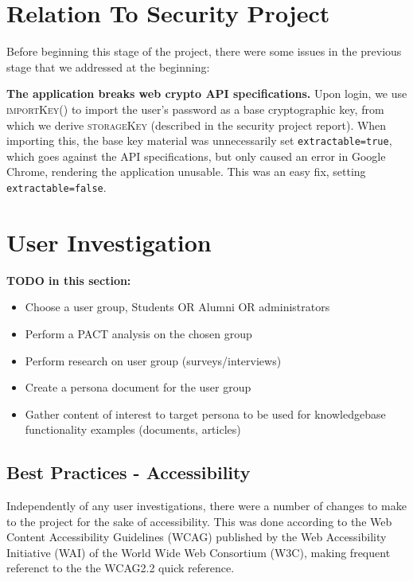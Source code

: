 \documentclass[12pt]{article}
\newcommand{\bryce}{\hfill\normalsize\sc [bkni0201]}
\newcommand{\skey}{\textsc{storageKey} }
\newcommand{\func}[1]{\textsc{#1()}}
\begin{document}
\tableofcontents
\newpage

\section{Relation To Security Project}

Before beginning this stage of the project, there were some issues in the previous stage that we addressed at the beginning:

\textbf{The application breaks web crypto API specifications.} Upon login, we use \func{importKey} to import the user's password as a base cryptographic key, from which we derive \skey (described in the security project report). When importing this, the base key material was unnecessarily set \texttt{extractable=true}, which goes against the API specifications, but only caused an error in Google Chrome, rendering the application unusable. This was an easy fix, setting \texttt{extractable=false}.


\section{User Investigation}

\textbf{TODO in this section:}
\begin{itemize}
    \item Choose a user group, Students OR Alumni OR administrators
    \item Perform a PACT analysis on the chosen group
    \item Perform research on user group (surveys/interviews)
    \item Create a persona document for the user group
    \item Gather content of interest to target persona to be used for knowledgebase functionality examples (documents, articles)
\end{itemize}

\subsection{Best Practices - Accessibility \bryce}

Independently of any user investigations, there were a number of changes to make to the project for the sake of accessibility. This was done according to the Web Content Accessibility Guidelines (WCAG) published by the Web Accessibility Initiative (WAI) of the World Wide Web Consortium (W3C), making frequent referenct to the the WCAG2.2 quick reference. \cite{wcag-quickref}
\end{document}
